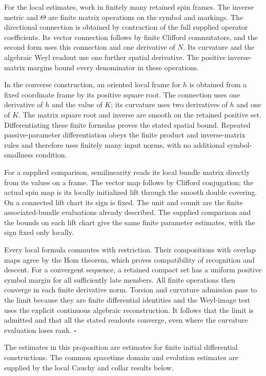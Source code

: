 \documentclass[
  english,
  11pt,
  reqno]{amsart}
\begin{document}
For the local estimates, work in finitely many retained spin frames. The
inverse metric and \(\Theta\) are finite matrix operations on the symbol
and markings. The directional connection is obtained by contraction of
the full supplied operator coefficients. Its vector connection follows
by finite Clifford commutators, and the second form uses this connection
and one derivative of \(N\). Its curvature and the algebraic Weyl
readout use one further spatial derivative. The positive inverse-matrix
margins bound every denominator in these operations.

In the converse construction, an oriented local frame for \(h\) is
obtained from a fixed coordinate frame by its positive square root. The
connection uses one derivative of \(h\) and the value of \(K\); its
curvature uses two derivatives of \(h\) and one of \(K\). The matrix
square root and inverse are smooth on the retained positive set.
Differentiating these finite formulas proves the stated spatial bound.
Repeated passive-parameter differentiation obeys the finite product and
inverse-matrix rules and therefore uses finitely many input norms, with
no additional symbol-smallness condition.

For a supplied comparison, semilinearity reads its local bundle matrix
directly from its values on a frame. The vector map follows by Clifford
conjugation; the actual spin map is its locally initialized lift through
the smooth double covering. On a connected lift chart its sign is fixed.
The unit and counit are the finite associated-bundle evaluations already
described. The supplied comparison and the bounds on each lift chart give the same finite parameter estimates, with the sign fixed only locally.

Every local formula commutes with restriction. Their compositions with
overlap maps agree by the Hom theorem, which proves compatibility of
recognition and descent. For a convergent sequence, a retained compact
set has a uniform positive symbol margin for all sufficiently late
members. All finite operations then converge in each finite derivative
norm. Torsion and curvature admission pass to the limit because they are
finite differential identities and the Weyl-image test uses the explicit
continuous algebraic reconstruction. It follows that the limit is
admitted and that all the stated readouts converge, even where the
curvature evaluation loses rank. \hfill\(\square\)

The estimates in this proposition are estimates for finite initial
differential constructions. The common spacetime domain and evolution
estimates are supplied by the local Cauchy and collar results below.
\end{document}

